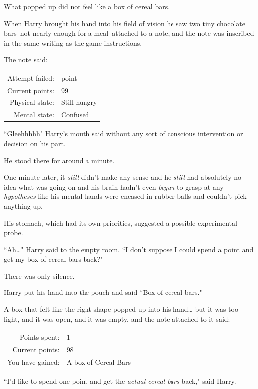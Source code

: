 What popped up did not feel like a box of cereal bars.

When Harry brought his hand into his field of vision he saw two tiny chocolate bars\---not nearly enough for a meal\---attached to a note, and the note was inscribed in the same writing as the game instructions.

The note said:

\begin{writtenNote}
\begin{tabular}{rl}
Attempt failed: & \minus1 point\\
Current points: & 99\\
Physical state: & Still hungry\\
Mental state: & Confused
\end{tabular}
\end{writtenNote}

``Gleehhhhh" Harry's mouth said without any sort of conscious intervention or decision on his part.

He stood there for around a minute.

One minute later, it \emph{still} didn't make any sense and he \emph{still} had absolutely no idea what was going on and his brain hadn't even \emph{begun} to grasp at any \emph{hypotheses} like his mental hands were encased in rubber balls and couldn't pick anything up.

His stomach, which had its own priorities, suggested a possible experimental probe.

``Ah{\ldots}" Harry said to the empty room. ``I don't suppose I could spend a point and get my box of cereal bars back?"

There was only silence.

Harry put his hand into the pouch and said ``Box of cereal bars."

A box that felt like the right shape popped up into his hand{\ldots} but it was too light, and it was open, and it was empty, and the note attached to it said:

\begin{writtenNote}
\begin{tabular}{rl}
Points spent: & 1\\
Current points: & 98\\
You have gained: & A box of Cereal Bars
\end{tabular}
\end{writtenNote}

``I'd like to spend one point and get the \emph{actual cereal bars} back," said Harry.


